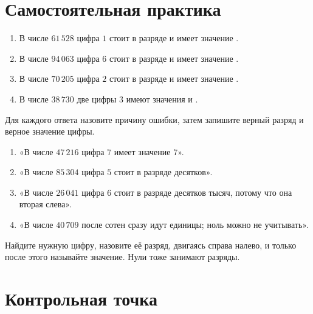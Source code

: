 \newpage
\section{Самостоятельная практика}

\begin{practicebox}
  \begin{enumerate}[label=\textbf{\arabic*.}]
    \item В числе \(61\,528\) цифра \(1\) стоит в разряде
      \answerblank[29mm] и имеет значение \answerblank[21mm].
    \item В числе \(94\,063\) цифра \(6\) стоит в разряде
      \answerblank[29mm] и имеет значение \answerblank[21mm].
    \item В числе \(70\,205\) цифра \(2\) стоит в разряде
      \answerblank[29mm] и имеет значение \answerblank[21mm].
    \item В числе \(38\,730\) две цифры \(3\) имеют значения
      \answerblank[25mm] и \answerblank[20mm].
  \end{enumerate}
\end{practicebox}

\begin{warningbox}
  Для каждого ответа назовите причину ошибки, затем запишите верный разряд и
  верное значение цифры.
  \begin{enumerate}[label=\textbf{\arabic*.}]
    \item «В числе \(47\,216\) цифра \(7\) имеет значение \(7\)».
    \item «В числе \(85\,304\) цифра \(5\) стоит в разряде десятков».
    \item «В числе \(26\,041\) цифра \(6\) стоит в разряде десятков тысяч,
      потому что она вторая слева».
    \item «В числе \(40\,709\) после сотен сразу идут единицы; ноль можно не
      учитывать».
  \end{enumerate}
\end{warningbox}

\begin{reflectionbox}
  Найдите нужную цифру, назовите её разряд, двигаясь справа налево, и только
  после этого называйте значение. Нули тоже занимают разряды.
\end{reflectionbox}

\newpage
\section{Контрольная точка}

